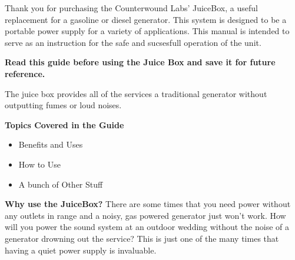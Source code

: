 \documentclass[../jb_user_manual.tex]{subfiles}
\begin{document}
\begin{flushleft}
\leftskip=3cm
Thank you for purchasing the Counterwound Labs' JuiceBox, a useful replacement for a gasoline or diesel generator. This system is designed to be a portable power supply for a variety of applications. This manual is intended to serve as an instruction for the safe and sucsesfull operation of the unit.

\vspace{2mm} 
\noindent 
\textbf{Read this guide before using the Juice Box and save it for future reference.}

\vspace{2mm}
The juice box provides all of the services a traditional generator without outputting fumes or loud noises.

\vspace{3mm}
\leftskip=0cm
\begin{Large}
	\textbf{Topics Covered in the Guide}
\end{Large}


\begin{itemize}
\setlength{\itemindent}{2.6cm} %
	\item Benefits and Uses
	\item How to Use
	\item A bunch of Other Stuff
\end{itemize}

\hangindent=3cm 
\textbf{Why use the JuiceBox?} \break 
There are some times that you need power without any outlets in range and a noisy, gas powered generator just won't work. How will you power the sound system at an outdoor wedding without the noise of a generator drowning out the service? This is just one of the many times that having a quiet power supply is invaluable. 

\end{flushleft}
\end{document}
